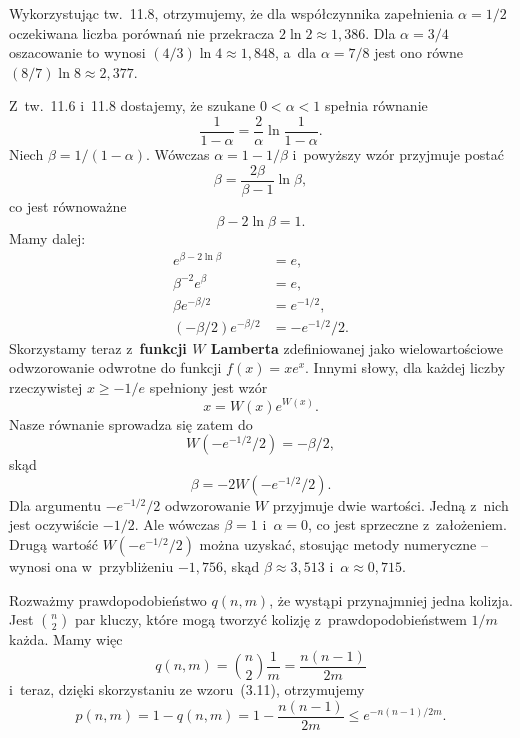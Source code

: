 \exercise %
Wykorzystując tw.~11.8, otrzymujemy, że dla współczynnika zapełnienia $\alpha=1/2$ oczekiwana liczba porównań nie przekracza $2\ln2\approx1{,}386$.
Dla $\alpha=3/4$ oszacowanie to wynosi $(4/3)\ln4\approx1{,}848$, a~dla $\alpha=7/8$ jest ono równe $(8/7)\ln8\approx2{,}377$.

\exercise %
Z~tw.~11.6 i~11.8 dostajemy, że szukane $0<\alpha<1$ spełnia równanie
\[
	\frac{1}{1-\alpha} = \frac{2}{\alpha}\ln\frac{1}{1-\alpha}.
\]
Niech $\beta=1/(1-\alpha)$.
Wówczas $\alpha=1-1/\beta$ i~powyższy wzór przyjmuje postać
\[
	\beta = \frac{2\beta}{\beta-1}\ln\beta,
\]
co jest równoważne
\[
	\beta-2\ln\beta = 1.
\]
Mamy dalej:
\begin{align*}
	e^{\beta-2\ln\beta} &= e, \\
	\beta^{-2}e^\beta &= e, \\
	\beta e^{-\beta/2} &= e^{-1/2}, \\
	(-\beta/2)e^{-\beta/2} &= -e^{-1/2}\!/2.
\end{align*}
Skorzystamy teraz z~\textbf{funkcji $W$ Lamberta} \cite{lambertwfunction} zdefiniowanej jako wielowartościowe odwzorowanie odwrotne do funkcji $f(x)=xe^x$.
Innymi słowy, dla każdej liczby rzeczywistej $x\ge-1/e$ spełniony jest wzór
\[
	x = W(x)e^{W(x)}.
\]
Nasze równanie sprowadza się zatem do
\[
	W(-e^{-1/2}\!/2) = -\beta/2,
\]
skąd
\[
	\beta = -2W(-e^{-1/2}\!/2).
\]
Dla argumentu $-e^{-1/2}\!/2$ odwzorowanie $W$ przyjmuje dwie wartości.
Jedną z~nich jest oczywiście $-1/2$.
Ale wówczas $\beta=1$ i~$\alpha=0$, co jest sprzeczne z~założeniem.
Drugą wartość $W(-e^{-1/2}\!/2)$ można uzyskać, stosując metody numeryczne -- wynosi ona w~przybliżeniu $-1{,}756$, skąd $\beta\approx3{,}513$ i~$\alpha\approx0{,}715$.


\exercise %

\noindent Rozważmy prawdopodobieństwo $q(n,m)$, że wystąpi przynajmniej jedna kolizja.
Jest $\binom{n}{2}$ par kluczy, które mogą tworzyć kolizję z~prawdopodobieństwem $1/m$ każda.
Mamy więc
\[
	q(n,m) = \binom{n}{2}\frac{1}{m} = \frac{n(n-1)}{2m}
\]
i~teraz, dzięki skorzystaniu ze wzoru~(3.11), otrzymujemy
\[
	p(n,m) = 1-q(n,m) = 1-\frac{n(n-1)}{2m} \le e^{-n(n-1)/2m}.
\]

